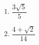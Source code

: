%
%
    \begin{enumerate}
        \item $\dfrac{3\sqrt{5}}{5}$
        \item $\dfrac{4 + \sqrt{2}}{14}$
    \end{enumerate}
